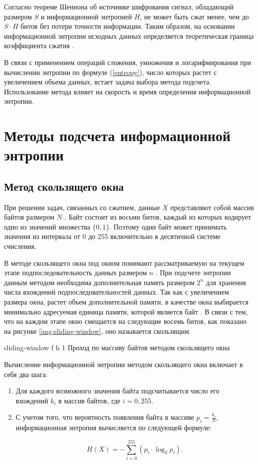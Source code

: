Согласно теореме Шеннона об источнике шифрования сигнал, обладающий размером $S$ и информационной энтропией $H$, не может быть сжат менее, чем до $S \cdot H$ битов без потери точности информации. Таким образом, на основании информационной энтропии исходных данных определяется теоретическая граница коэффициента сжатия \cite{theorem}.

В связи с применением операций сложения, умножения и логарифмирования при вычислении энтропии по формуле (\ref{entropy}), число которых растет с увеличением объема данных, встает задача выбора метода подсчета. Использование метода влияет на скорость и время определения информационной энтропии.

\section{Методы подсчета информационной энтропии}

\subsection{Метод скользящего окна}\label{sliding-window}

При решении задач, связанных со сжатием, данные $X$ представляют собой массив байтов размером $N$ \cite{bytes}. Байт состоит из восьми битов, каждый из которых кодирует одно из значений множества $\{0, 1\}$. Поэтому один байт может принимать значения из интервала от 0 до 255 включительно в десятичной системе счисления. 

В методе скользящего окна под окном понимают рассматриваемую на текущем этапе подпоследовательность данных размером $n$ \cite{sliding-window-method}. При подсчете энтропии данным методом необходима дополнительная память размером $2^n$ для хранения числа вхождений подпоследовательностей данных. Так как с увеличением размера окна, растет объем дополнительной памяти, в качестве окна выбирается минимально адресуемая единица памяти, которой является байт \cite{memory-unit}. В связи с тем, что на каждом этапе окно смещается на следующие восемь битов, как показано на рисунке \ref{img:sliding-window}, оно называется скользящим.

    {sliding-window}
    {f}
    {h}
    {1\textwidth}
    {Проход по массиву байтов методом скользящего окна}
    
Вычисление информационной энтропии методом скользящего окна включает в себя два шага:

\begin{enumerate}
	\item Для каждого возможного значения байта подсчитывается число его вхождений $k_{i}$ в массив байтов, где $i = \overline{0, 255}$.
	\item С учетом того, что вероятность появления байта в массиве $p_{i} = \frac{k_{i}}{N}$, информационная энтропия вычисляется по следующей формуле:
	
	\begin{equation}
		H(X) = -\sum_{i = 0}^{255} (p_{i} \cdot \log_{2}p_{i}).
	\end{equation}
\end{enumerate}

